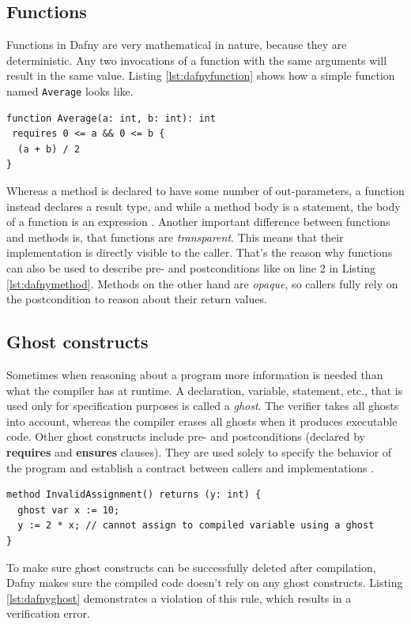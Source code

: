 \documentclass[a4paper]{article}
\begin{document}
\subsection{Functions}
Functions in Dafny are very mathematical in nature, because they are deterministic. Any two invocations of a
function with the same arguments will result in the same value. Listing \ref{lst:dafnyfunction} shows how a simple
function named \texttt{Average} looks like.
\begin{lstlisting}[style=dafnystyle, caption={A simple function in Dafny.}, label={lst:dafnyfunction}]
function Average(a: int, b: int): int 
 requires 0 <= a && 0 <= b {
  (a + b) / 2
}
\end{lstlisting}
Whereas a method is declared to have some number of out-parameters, a function instead declares a result type,
and while a method body is a statement, the body of a function is an expression \cite{leino2023program}.
Another important difference between functions and methods is, that functions are \textit{transparent}. This means
that their implementation is directly visible to the caller. That's the reason why functions can also be used
to describe pre- and postconditions like on line 2 in Listing \ref{lst:dafnymethod}. Methods on the other hand are
\textit{opaque}, so callers fully rely on the postcondition to reason about their return values.
\subsection{Ghost constructs}
Sometimes when reasoning about a program more information is needed than what the compiler has at runtime.
A declaration, variable, statement, etc., that is used only for specification purposes is called a \textit{ghost}.
The verifier takes all ghosts into account, whereas the compiler erases all ghosts when it produces executable code.
Other ghost constructs include pre- and postconditions (declared by \textbf{requires} and \textbf{ensures} clauses).
They are used solely to specify the behavior of the program and establish a contract between callers and implementations \cite{leino2023program}.
\begin{lstlisting}[style=dafnystyle, caption={Invalid assignment to ghost.}, label={lst:dafnyghost}]
method InvalidAssignment() returns (y: int) {
  ghost var x := 10;
  y := 2 * x; // cannot assign to compiled variable using a ghost
}
\end{lstlisting}
To make sure ghost constructs can be successfully deleted after compilation, Dafny makes sure the compiled code
doesn't rely on any ghost constructs. Listing \ref{lst:dafnyghost} demonstrates a violation of this rule, which
results in a verification error.
\end{document}

